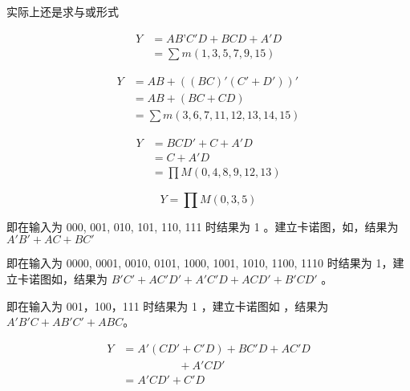 \documentclass[lang=cn,11pt,a4paper,cite=authoryear,twocolumn]{elegantpaper}
\begin{document}
  实际上还是求与或形式


\[\begin{aligned}
Y &= AB’C'D + BCD + A'D \\
&= \sum m(1, 3, 5, 7, 9, 15)
\end{aligned}\]


\[\begin{aligned}
Y &= AB + ((BC)'(C'+D'))' \\ 
&= AB + (BC + CD) \\ 
&= \sum m(3,  6, 7, 11,12, 13, 14, 15)
\end{aligned}\]



\[\begin{aligned}
Y &= BCD' + C + A'D \\
&= C + A'D \\
&= \prod M(0, 4, 8, 9, 12, 13)
\end{aligned}\]


\[
Y = \prod M(0, 3, 5)
\]



即在输入为 000, 001, 010, 101, 110, 111 时结果为 1 。建立卡诺图，如，结果为 \(A'B' + AC + BC'\)



即在输入为 0000, 0001, 0010, 0101, 1000, 1001, 1010, 1100, 1110 时结果为 1，建立卡诺图如，结果为 \(B'C' + AC'D' + A'C'D + ACD' + B'CD'\) 。





即在输入为 001，100，111 时结果为 1 ，建立卡诺图如 ，结果为\(A'B'C + AB'C' + ABC\)。




\[\begin{aligned}
Y &= A'(CD'+C'D) + BC'D + AC'D\\
&\quad\quad\quad\quad\quad  + A'CD' \\ 
&= A'CD' + C'D
\end{aligned}\]
\end{document}
